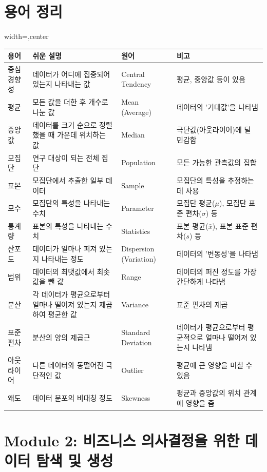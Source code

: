 \documentclass[11pt,a4paper]{book}
\theoremstyle{definition}
\begin{document}
\section{용어 정리}
\begin{adjustbox}{width=\textwidth,center}
\begin{tabular}{llll}
\toprule
\textbf{용어} & \textbf{쉬운 설명} & \textbf{원어} & \textbf{비고} \\
\midrule
중심 경향성 & 데이터가 어디에 집중되어 있는지 나타내는 값 & Central Tendency & 평균, 중앙값 등이 있음 \\
평균 & 모든 값을 더한 후 개수로 나눈 값 & Mean (Average) & 데이터의 '기대값'을 나타냄 \\
중앙값 & 데이터를 크기 순으로 정렬했을 때 가운데 위치하는 값 & Median & 극단값(아웃라이어)에 덜 민감함 \\
모집단 & 연구 대상이 되는 전체 집단 & Population & 모든 가능한 관측값의 집합 \\
표본 & 모집단에서 추출한 일부 데이터 & Sample & 모집단의 특성을 추정하는 데 사용 \\
모수 & 모집단의 특성을 나타내는 수치 & Parameter & 모집단 평균($\mu$), 모집단 표준 편차($\sigma$) 등 \\
통계량 & 표본의 특성을 나타내는 수치 & Statistics & 표본 평균($\bar{x}$), 표본 표준 편차($s$) 등 \\
산포도 & 데이터가 얼마나 퍼져 있는지 나타내는 정도 & Dispersion (Variation) & 데이터의 '변동성'을 나타냄 \\
범위 & 데이터의 최댓값에서 최솟값을 뺀 값 & Range & 데이터의 퍼진 정도를 가장 간단하게 나타냄 \\
분산 & 각 데이터가 평균으로부터 얼마나 떨어져 있는지 제곱하여 평균한 값 & Variance & 표준 편차의 제곱 \\
표준 편차 & 분산의 양의 제곱근 & Standard Deviation & 데이터가 평균으로부터 평균적으로 얼마나 떨어져 있는지 나타냄 \\
아웃라이어 & 다른 데이터와 동떨어진 극단적인 값 & Outlier & 평균에 큰 영향을 미칠 수 있음 \\
왜도 & 데이터 분포의 비대칭 정도 & Skewness & 평균과 중앙값의 위치 관계에 영향을 줌 \\
\bottomrule
\end{tabular}
\end{adjustbox}


\section{Module 2: 비즈니스 의사결정을 위한 데이터 탐색 및 생성}
\end{document}

